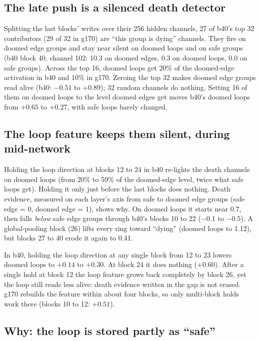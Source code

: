 \documentclass[11pt]{article}
\newcommand{\pos}[1]{$+#1$}
\newcommand{\nega}[1]{$-#1$}
\begin{document}
\subsection{The late push is a silenced death detector}

Splitting the last blocks' writes over their 256 hidden channels, 27 of b40's top 32 contributors (29 of 32 in g170) are ``this group is dying'' channels. They fire on doomed edge groups and stay near silent on doomed loops and on safe groups (b40 block 40, channel 102: 10.3 on doomed edges, 0.3 on doomed loops, 0.0 on safe groups). Across the top 16, doomed loops get 20\% of the doomed-edge activation in b40 and 10\% in g170. Zeroing the top 32 makes doomed edge groups read alive (b40: \nega{0.51} to \pos{0.89}); 32 random channels do nothing. Setting 16 of them on doomed loops to the level doomed edges get moves b40's doomed loops from \pos{0.65} to \pos{0.27}, with safe loops barely changed.

\subsection{The loop feature keeps them silent, during mid-network}

Holding the loop direction at blocks 12 to 24 in b40 re-lights the death channels on doomed loops (from 20\% to 59\% of the doomed-edge level, twice what safe loops get). Holding it only just before the last blocks does nothing. Death evidence, measured on each layer's axis from safe to doomed edge groups (safe edge = 0, doomed edge = 1), shows why. On doomed loops it starts near 0.7, then falls \emph{below} safe edge groups through b40's blocks 10 to 22 (\nega{0.1} to \nega{0.5}). A global-pooling block (26) lifts every ring toward ``dying'' (doomed loops to 1.12), but blocks 27 to 40 erode it again to 0.41.

In b40, holding the loop direction at any single block from 12 to 23 lowers doomed loops to \pos{0.14} to \pos{0.30}. At block 24 it does nothing (\pos{0.60}). After a single hold at block 12 the loop feature grows back completely by block 26, yet the loop still reads less alive: death evidence written in the gap is not erased. g170 rebuilds the feature within about four blocks, so only multi-block holds work there (blocks 10 to 12: \pos{0.51}).

\subsection{Why: the loop is stored partly as ``safe''}
\end{document}
